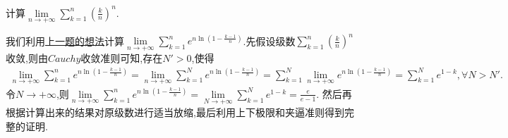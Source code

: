 \documentclass[lang=cn,newtx,10pt,scheme=chinese]{elegantbook}
\begin{document}
\begin{example}
   计算$\underset{n\rightarrow +\infty}{\lim}\sum\limits_{k=1}^n{\left( \frac{k}{n} \right) ^n}$.
\end{example}
\begin{note}
   我们利用\hyperref[计算二元数列求和的极限的思路]{上一题的想法}计算$\underset{n\rightarrow +\infty}{\lim}\sum\limits_{k=1}^n{e^{n\ln \left( 1-\frac{k-1}{n} \right)}}$.先假设级数$\sum\limits_{k=1}^n{\left( \frac{k}{n} \right) ^n}$收敛,则由$Cauchy$收敛准则可知,存在$N'>0$,使得
   \begin{align*}
      \underset{n\rightarrow +\infty}{\lim}\sum\limits_{k=1}^n{e^{n\ln \left( 1-\frac{k-1}{n} \right)}}=\underset{n\rightarrow +\infty}{\lim}\sum\limits_{k=1}^N{e^{n\ln \left( 1-\frac{k-1}{n} \right)}}=\sum\limits_{k=1}^N{\underset{n\rightarrow +\infty}{\lim}e^{n\ln \left( 1-\frac{k-1}{n} \right)}=\sum\limits_{k=1}^N{e^{1-k}},\forall N>N'}.
   \end{align*}
   令$N\to +\infty$,则$\underset{n\rightarrow +\infty}{\lim}\sum\limits_{k=1}^n{e^{n\ln \left( 1-\frac{k-1}{n} \right)}}=\underset{N\rightarrow +\infty}{\lim}\sum\limits_{k=1}^N{e^{1-k}}=\frac{e}{e-1}$.
然后再根据计算出来的结果对原级数进行适当放缩,最后利用上下极限和夹逼准则得到完整的证明.
\end{note}
\end{document}
